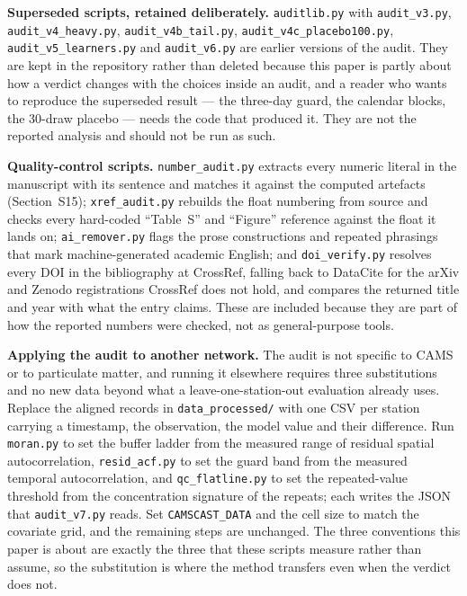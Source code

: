 \documentclass[review,times,authoryear]{elsarticle}
\begin{document}
\noindent\textbf{Superseded scripts, retained deliberately.} \texttt{auditlib.py} with
\texttt{audit\_v3.py}, \texttt{audit\_v4\_heavy.py}, \texttt{audit\_v4b\_tail.py},
\texttt{audit\_v4c\_placebo100.py}, \texttt{audit\_v5\_learners.py} and
\texttt{audit\_v6.py} are earlier versions of the audit. They are kept in the repository
rather than deleted because this paper is partly about how a verdict changes with the
choices inside an audit, and a reader who wants to reproduce the superseded result --- the
three-day guard, the calendar blocks, the 30-draw placebo --- needs the code that produced
it. They are not the reported analysis and should not be run as such.

\noindent\textbf{Quality-control scripts.} \texttt{number\_audit.py} extracts every
numeric literal in the manuscript with its sentence and matches it against the computed
artefacts (Section~S15); \texttt{xref\_audit.py} rebuilds the float numbering from source
and checks every hard-coded ``Table~S'' and ``Figure'' reference against the float it
lands on; \texttt{ai\_remover.py} flags the prose constructions and repeated phrasings
that mark machine-generated academic English; and \texttt{doi\_verify.py} resolves every
DOI in the bibliography at CrossRef, falling back to DataCite for the arXiv and Zenodo
registrations CrossRef does not hold, and compares the returned title and year with what
the entry claims. These are included because they are part of
how the reported numbers were checked, not as general-purpose tools.

\noindent\textbf{Applying the audit to another network.} The audit is not specific to
CAMS or to particulate matter, and running it elsewhere requires three substitutions and
no new data beyond what a leave-one-station-out evaluation already uses. Replace the
aligned records in \texttt{data\_processed/} with one CSV per station carrying a
timestamp, the observation, the model value and their difference. Run
\texttt{moran.py} to set the buffer ladder from the measured range of residual spatial
autocorrelation, \texttt{resid\_acf.py} to set the guard band from the measured temporal
autocorrelation, and \texttt{qc\_flatline.py} to set the repeated-value threshold from the
concentration signature of the repeats; each writes the JSON that \texttt{audit\_v7.py}
reads. Set \texttt{CAMSCAST\_DATA} and the cell size to match the covariate grid, and the
remaining steps are unchanged. The three conventions this paper is about are exactly the
three that these scripts measure rather than assume, so the substitution is where the
method transfers even when the verdict does not.
\end{document}
